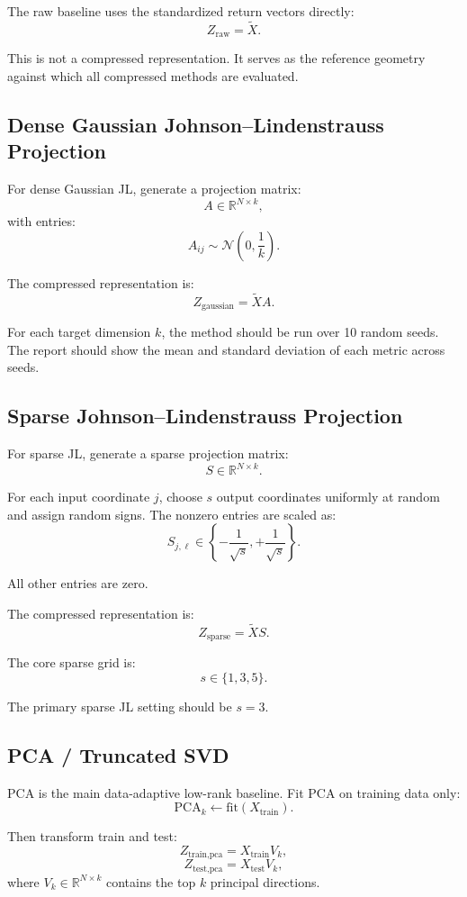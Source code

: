 \documentclass[11pt]{article}
\begin{document}
The raw baseline uses the standardized return vectors directly:
\[
Z_{\text{raw}} = \widetilde{X}.
\]

This is not a compressed representation. It serves as the reference geometry against which all compressed methods are evaluated.

\subsection{Dense Gaussian Johnson--Lindenstrauss Projection}

For dense Gaussian JL, generate a projection matrix:
\[
A \in \mathbb{R}^{N \times k},
\]
with entries:
\[
A_{ij} \sim \mathcal{N}\left(0, \frac{1}{k}\right).
\]

The compressed representation is:
\[
Z_{\text{gaussian}} = \widetilde{X} A.
\]

For each target dimension $k$, the method should be run over 10 random seeds. The report should show the mean and standard deviation of each metric across seeds.

\subsection{Sparse Johnson--Lindenstrauss Projection}

For sparse JL, generate a sparse projection matrix:
\[
S \in \mathbb{R}^{N \times k}.
\]

For each input coordinate $j$, choose $s$ output coordinates uniformly at random and assign random signs. The nonzero entries are scaled as:
\[
S_{j,\ell} \in \left\{ -\frac{1}{\sqrt{s}}, +\frac{1}{\sqrt{s}} \right\}.
\]

All other entries are zero.

The compressed representation is:
\[
Z_{\text{sparse}} = \widetilde{X} S.
\]

The core sparse grid is:
\[
s \in \{1, 3, 5\}.
\]

The primary sparse JL setting should be $s=3$.

\subsection{PCA / Truncated SVD}

PCA is the main data-adaptive low-rank baseline. Fit PCA on training data only:
\[
\text{PCA}_k \leftarrow \text{fit}(X_{\text{train}}).
\]

Then transform train and test:
\[
Z_{\text{train,pca}} = X_{\text{train}} V_k,
\]
\[
Z_{\text{test,pca}} = X_{\text{test}} V_k,
\]
where $V_k \in \mathbb{R}^{N \times k}$ contains the top $k$ principal directions.
\end{document}
